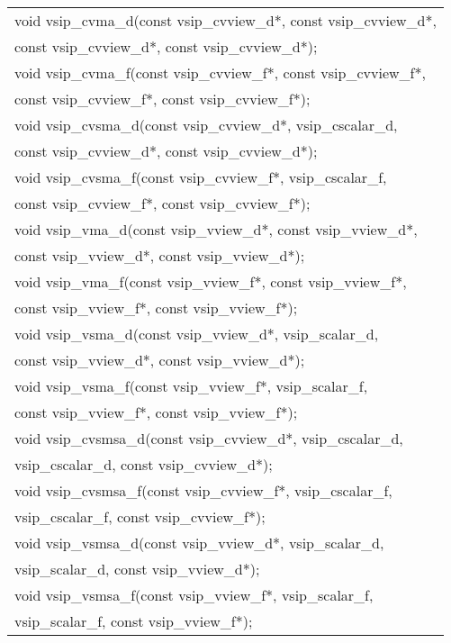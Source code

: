 \\\cvsiplh
\afh
{
\ttfamily
\\\hspace*{.04\textwidth}\begin{tabular}[H]{l}
void vsip\_cvma\_d(const vsip\_cvview\_d*, const vsip\_cvview\_d*,\\*\hspace{.7cm}const vsip\_cvview\_d*, const vsip\_cvview\_d*);\\
void vsip\_cvma\_f(const vsip\_cvview\_f*, const vsip\_cvview\_f*,\\*\hspace{.7cm}const vsip\_cvview\_f*, const vsip\_cvview\_f*);\\
void vsip\_cvsma\_d(const vsip\_cvview\_d*, vsip\_cscalar\_d,\\*\hspace{.7cm}const vsip\_cvview\_d*, const vsip\_cvview\_d*);\\
void vsip\_cvsma\_f(const vsip\_cvview\_f*, vsip\_cscalar\_f,\\*\hspace{.7cm}const vsip\_cvview\_f*, const vsip\_cvview\_f*);\\
void vsip\_vma\_d(const vsip\_vview\_d*, const vsip\_vview\_d*,\\*\hspace{.7cm}const vsip\_vview\_d*, const vsip\_vview\_d*);\\
void vsip\_vma\_f(const vsip\_vview\_f*, const vsip\_vview\_f*,\\*\hspace{.7cm}const vsip\_vview\_f*, const vsip\_vview\_f*);\\
void vsip\_vsma\_d(const vsip\_vview\_d*, vsip\_scalar\_d,\\*\hspace{.7cm}const vsip\_vview\_d*, const vsip\_vview\_d*);\\
void vsip\_vsma\_f(const vsip\_vview\_f*, vsip\_scalar\_f,\\*\hspace{.7cm}const vsip\_vview\_f*, const vsip\_vview\_f*);\\
void vsip\_cvsmsa\_d(const vsip\_cvview\_d*, vsip\_cscalar\_d,\\*\hspace{.7cm}vsip\_cscalar\_d, const vsip\_cvview\_d*);\\
void vsip\_cvsmsa\_f(const vsip\_cvview\_f*, vsip\_cscalar\_f,\\*\hspace{.7cm}vsip\_cscalar\_f, const vsip\_cvview\_f*);\\
void vsip\_vsmsa\_d(const vsip\_vview\_d*, vsip\_scalar\_d,\\*\hspace{.7cm}vsip\_scalar\_d, const vsip\_vview\_d*);\\
void vsip\_vsmsa\_f(const vsip\_vview\_f*, vsip\_scalar\_f,\\*\hspace{.7cm}vsip\_scalar\_f, const vsip\_vview\_f*);\\
\end{tabular}
}
